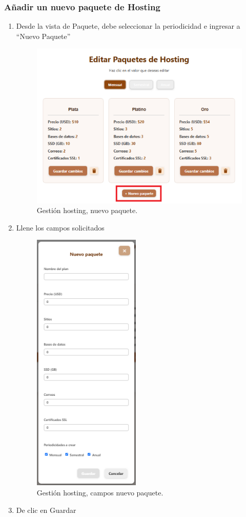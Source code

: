 \subsubsection*{Añadir un nuevo paquete de Hosting}
\begin{enumerate}
	\item Desde la vista de Paquete, debe seleccionar la periodicidad e ingresar a “Nuevo Paquete”
	\begin{figure}[H]
        \centering
        \includegraphics[width=0.7\linewidth]{guiamodulo/gestion-hosting-nuevo.png}
        \caption{Gestión hosting, nuevo paquete.}
        \label{fig:gestion-hosting-nuevo.png}
    \end{figure}

	\item Llene los campos solicitados
	\begin{figure}[H]
        \centering
        \includegraphics[width=0.2\linewidth]{guiamodulo/gestion-hosting-nuevo-campos.png}
        \caption{Gestión hosting, campos nuevo paquete.}
        \label{fig:gestion-hosting-nuevo-campos.png}
    \end{figure}

    \item De clic en Guardar
\end{enumerate}


